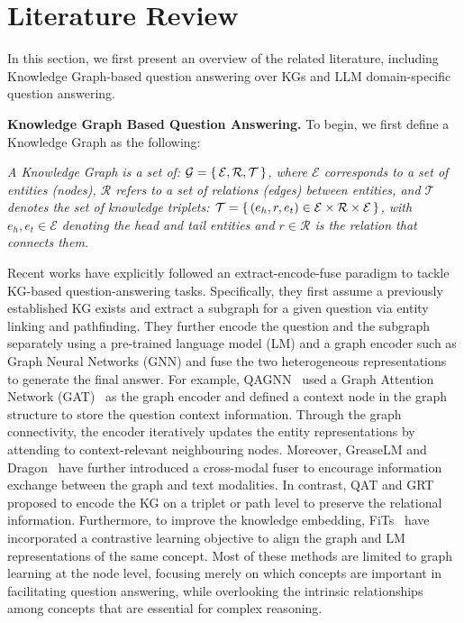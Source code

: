 \section*{Literature Review}

In this section, we first present an overview of the related literature, including Knowledge Graph-based question answering over KGs and LLM domain-specific question answering.

\textbf{Knowledge Graph Based Question Answering. }
To begin, we first define a Knowledge Graph as the following:
\begin{definition}
    \emph{A Knowledge Graph is a set of: $\mathcal G = \set{\mathcal E, \mathcal R, \mathcal T}$, where $\mathcal E$ corresponds to a set of entities (nodes),
    $\mathcal R$ refers to a set of relations (edges) between entities,
    and $\mathcal T$ denotes the set of knowledge triplets: $\mathcal T = \set{(e_h,r,e_t)\in \mathcal E\times \mathcal R\times \mathcal E}$, with $e_h, e_t \in \mathcal E$ denoting the head and tail entities
    and $r\in\mathcal R$ is the relation that connects them.}
\end{definition}

Recent works have explicitly followed an extract-encode-fuse paradigm to tackle KG-based question-answering tasks.
Specifically, they first assume a previously established KG exists and extract a subgraph for a given question via entity linking and pathfinding. 
They further encode the question and the subgraph separately using a pre-trained language model (LM) and a graph encoder such as Graph Neural Networks (GNN) and fuse the two heterogeneous representations to generate the final answer.
For example, QAGNN~\parencite{qagnn} used a Graph Attention Network (GAT)~\parencite{gat} as the graph encoder and defined a context node in the graph structure to store the question context information. 
Through the graph connectivity, the encoder iteratively updates the entity representations by attending to context-relevant neighbouring nodes.
Moreover, GreaseLM and Dragon~\parencite{greaselm, dragon} have further introduced a cross-modal fuser to encourage information exchange between the graph and text modalities. 
In contrast, QAT and GRT~\parencite{qat, grt} proposed to encode the KG on a triplet or path level to preserve the relational information.
Furthermore, to improve the knowledge embedding, FiTs~\parencite{fits} have incorporated a contrastive learning objective to align the graph and LM representations of the same concept. Most of these methods are limited to graph learning at the node level, focusing merely on which concepts are important in facilitating question answering, while overlooking the intrinsic relationships among concepts that are essential for complex reasoning. 

